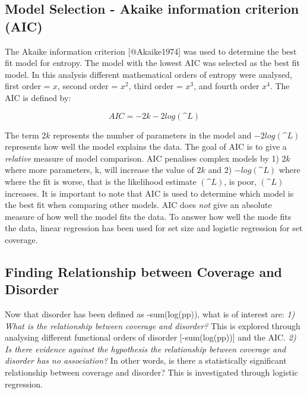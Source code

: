 \subsection{Model Selection - Akaike information criterion (AIC)}
The Akaike information criterion [@Akaike1974] was used to determine the best fit model for entropy. The model with the lowest AIC was selected as the best fit model. In this analysis different mathematical orders of entropy were analysed, first order = $x$, second order = $x^2$, third order = $x^3$, and fourth order $x^4$. The AIC is defined by:

\begin{equation}
\label{AIC}
{AIC}
 = -2k - 2log(\^L)
\end{equation}

The term $2k$ represents the number of parameters in the model and $-2log(\^L)$ represents how well the model explains the data. The goal of AIC is to give a \emph{relative} measure of model comparison. AIC penalises complex models by 1) $2k$ where more parameters, k, will increase the value of $2k$ and 2) $-log(\^L)$ where where the fit is worse, that is the likelihood estimate $(\^L)$, is poor, $(\^L)$ increases. It is important to note that AIC is used to determine which model is the best fit when comparing other models. AIC does \emph{not} give an absolute measure of how well the model fits the data. To answer how well the mode fits the data, linear regression has been used for set size and logistic regression for set coverage.  

\subsection{Finding Relationship between Coverage and Disorder}
Now that disorder has been defined as -sum(log(pp)), what is of interest are: \emph{1) What is the relationship between coverage and disorder?} This is explored through analysing different functional orders of disorder [-sum(log(pp))] and the AIC. \emph{2) Is there evidence against the hypothesis the relationship between coverage and disorder has no association?} In other words, is there a statistically significant relationship between coverage and disorder? This is investigated through logistic regression. 


